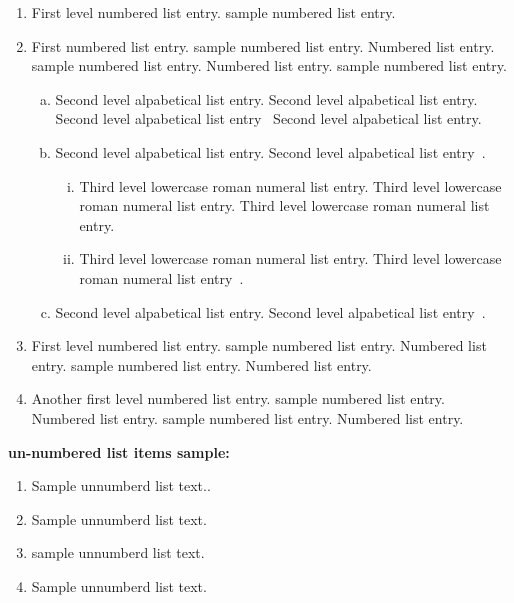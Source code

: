 \documentclass[APA,LATO1COL]{WileyNJD-v2}
\begin{document}
\begin{enumerate}[1.]
\item First level numbered list entry. sample numbered list entry. 

\item First numbered list entry. sample numbered list entry. Numbered list entry. sample numbered list entry. Numbered list entry. sample numbered list entry. 

\begin{enumerate}[a.]
\item Second level alpabetical list entry. Second level alpabetical list entry. Second level alpabetical list entry~\citet{Allen2011} Second level alpabetical list entry. 

\item Second level alpabetical list entry. Second level alpabetical list entry~\citet{Schulz2012,Allen2011,Ballen2011}.

\begin{enumerate}[ii.]
\item Third level lowercase roman numeral list entry. Third level lowercase roman numeral list entry. Third level lowercase roman numeral list entry. 

\item Third level lowercase roman numeral list entry. Third level lowercase roman numeral list entry~\cite{Yoo2007}.
\end{enumerate}

\item Second level alpabetical list entry. Second level alpabetical list entry~\cite{Elbaum2002}.
\end{enumerate}

\item First level numbered list entry. sample numbered list entry. Numbered list entry. sample numbered list entry. Numbered list entry. 

\item Another first level numbered list entry. sample numbered list entry. Numbered list entry. sample numbered list entry. Numbered list entry. 
\end{enumerate}

\noindent\textbf{un-numbered list items sample:}

\begin{enumerate}[]
\item Sample unnumberd list text..
\item Sample unnumberd list text.
\item sample unnumberd list text. 
\item Sample unnumberd list text.
\end{enumerate}
\end{document}
